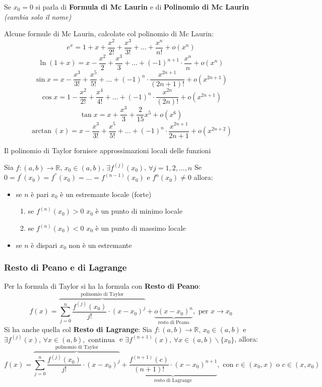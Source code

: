 \documentclass[a4paper,12pt, oneside]{book}
\begin{document}
\begin{teorema}
	Se $x_0=0$ si parla di \textbf{Formula di Mc Laurin} e di \textbf{Polinomio di Mc Laurin} \textit{(cambia solo il nome)}
\end{teorema}
\newpage
\begin{shaded}
	Alcune formule di Mc Laurin, calcolate col polinomio di Mc Laurin:
	$$e^{x}=1+x+\frac{x^2}{2!}+\frac{x^3}{3!}+...+\frac{x^n}{n!}+o(x^n)$$
	$$\ln(1+x)=x-\frac{x^2}{2}+\frac{x^3}{3}+...+(-1)^{n+1}\cdot\frac{x^n}{n}+o(x^n)$$
	$$\sin x=x-\frac{x^3}{3!}+\frac{x^5}{5!}+...+(-1)^{n}\cdot\frac{x^{2n+1}}{(2n+1)!}+o(x^{2n+1})$$
	$$\cos x=1-\frac{x^2}{2!}+\frac{x^4}{4!}+...+(-1)^{n}\cdot\frac{x^{2n}}{(2n)!}+o(x^{2n+1})$$
	$$\tan x=x+\frac{x^3}{3}+\frac{2}{15}x^5+o(x^6)$$
	$$\arctan(x)=x-\frac{x^3}{3!}+\frac{x^5}{5!}+...+(-1)^{n}\cdot\frac{x^{2n+1}}{2n+1}+o(x^{2n+2})$$
\end{shaded}
\begin{nota}
	Il polinomio di Taylor fornisce approssimazioni locali delle funzioni
\end{nota}
\begin{teorema}
	Sia $f:(a,b)\rightarrow\mathbb{R}$, $x_0\in (a,b)$, $\exists f^{(j)}(x_0)$, $ \forall j=1,2,...,n$
	Se $0=f^{'}(x_0)=f^{''}(x_0)=...=f^{(n-1)}(x_0)$ e $f^{n}(x_0)\neq 0$ allora:
	\begin{itemize}
		\item se $n$ è pari $x_0$ è un estremante locale (forte)
		      \begin{enumerate}
			      \item se $f^{(n)}(x_0)>0$ $x_0$ è un punto di minimo locale
			      \item se $f^{(n)}(x_0)<0$ $x_0$ è un punto di massimo locale
		      \end{enumerate}
		\item se $n$ è dispari $x_0$ non è un estremante
	\end{itemize}
\end{teorema}
\subsubsection{Resto di Peano e di Lagrange}
Per la formula di Taylor si ha la formula con \textbf{Resto di Peano}:
$$f(x)=\overbrace{\sum_{j=0}^{n} \frac{f^{(j)}(x_0)}{j!}\cdot {(x-x_0)}^j}^{\mbox{polinomio di Taylor}}+\underbrace{o(x-x_0)^n}_{\mbox{resto di Peano}}, \mbox{ per } x\rightarrow x_0$$
Si ha anche quella col \textbf{Resto di Lagrange}:
Sia $f:(a,b)\rightarrow \mathbb{R},\, x_0\in (a,b)$  e $\exists f^{(j)}(x),\, \forall x\in (a,b), \mbox{ continua }$ e $\exists f^{(n+1)}(x),\, \forall x\in(a,b)\backslash \{x_0\}$, allora:
$$f(x)=\overbrace{\sum_{j=0}^{n} \frac{f^{(j)}(x_0)}{j!}\cdot {(x-x_0)}^j}^{\mbox{polinomio di Taylor}}+\underbrace{\frac{f^{(n+1)}(c)}{(n+1)!}\cdot(x-x_0)^{n+1}}_{\mbox{resto di Lagrange}},\mbox{ con } c\in(x_0,x) \mbox{ o } c\in (x,x_0)$$
\end{document}
